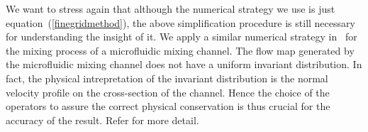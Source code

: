 We want to stress again that although the numerical strategy we use is just equation~(\ref{finegridmethod}), the above simplification procedure is still necessary for understanding the insight of it. We apply a similar numerical strategy in~\cite{topopt} for the mixing process of a microfluidic mixing channel. The flow map generated by the microfluidic mixing channel does not have a uniform invariant distribution. In fact, the physical intrepretation of the invariant distribution is the normal velocity profile on the cross-section of the channel. Hence the choice of the operators to assure the correct physical conservation is thus crucial for the accuracy of the result. Refer \cite{topopt} for more detail.   




